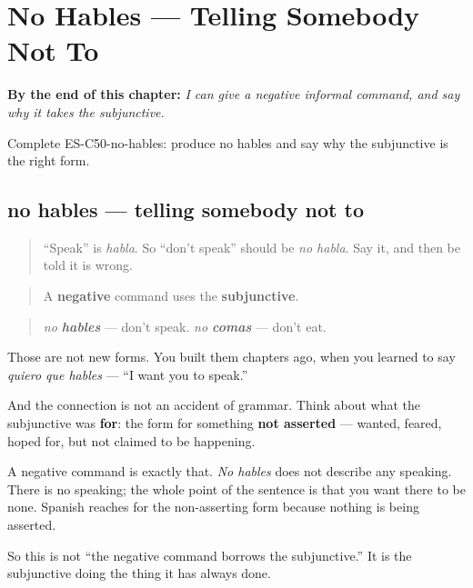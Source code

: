 
\chapter{No Hables --- Telling Somebody Not To}
\label{ch:command-negative}

\begin{chapteropening}
\textbf{By the end of this chapter:} \emph{I can give a negative informal command, and say why it takes the subjunctive.}

Complete ES-C50-no-hables: produce no hables and say why the subjunctive is the right form.
\end{chapteropening}

\section[no hables]{no hables — telling somebody not to}

\label{lesson:ES-C50-no-hables}



\begin{quote}
\textquotedblleft{}Speak\textquotedblright{} is \emph{habla}. So \textquotedblleft{}don't speak\textquotedblright{} should be \emph{no habla}. Say it, and then be told it is wrong.
\end{quote}

\begin{grammarlens}[title={Grammar Lens: the form you already learned for wanting}]
\begin{quote}
A \textbf{negative} command uses the \textbf{subjunctive}.
\end{quote}

\begin{quote}
\emph{no \textbf{hables}} — don't speak. \emph{no \textbf{comas}} — don't eat.
\end{quote}

Those are not new forms. You built them chapters ago, when you learned to say \emph{quiero que hables} — \textquotedblleft{}I want you to speak.\textquotedblright{}

And the connection is not an accident of grammar. Think about what the subjunctive was \textbf{for}: the form for something \textbf{not asserted} — wanted, feared, hoped for, but not claimed to be happening.

A negative command is exactly that. \emph{No hables} does not describe any speaking. There is no speaking; the whole point of the sentence is that you want there to be none. Spanish reaches for the non-asserting form because nothing is being asserted.

So this is not \textquotedblleft{}the negative command borrows the subjunctive.\textquotedblright{} It is the subjunctive doing the thing it has always done.
\end{grammarlens}

